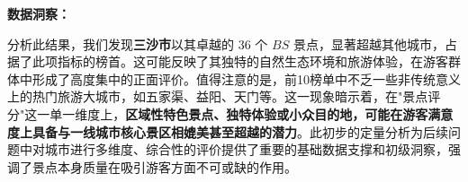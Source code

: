 \documentclass[12pt]{article}
\begin{document}
\textbf{数据洞察：}

分析此结果，我们发现\textbf{三沙市}以其卓越的 36 个 $BS$ 景点，显著超越其他城市，占据了此项指标的榜首。这可能反映了其独特的自然生态环境和旅游体验，在游客群体中形成了高度集中的正面评价。值得注意的是，前10榜单中不乏一些非传统意义上的热门旅游大城市，如五家渠、益阳、天门等。这一现象暗示着，在"景点评分"这一单一维度上，\textbf{区域性特色景点、独特体验或小众目的地，可能在游客满意度上具备与一线城市核心景区相媲美甚至超越的潜力}。此初步的定量分析为后续问题中对城市进行多维度、综合性的评价提供了重要的基础数据支撑和初级洞察，强调了景点本身质量在吸引游客方面不可或缺的作用。
\end{document}
